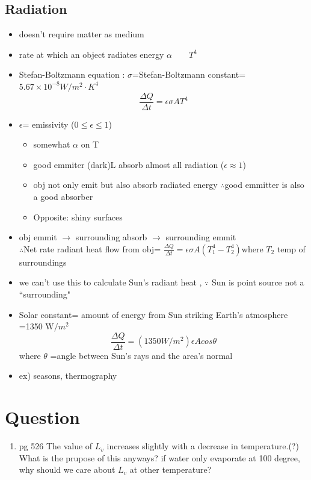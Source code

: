 \documentclass[12 pt , twoside, letterpaper] {article}
\begin{document}
		\subsection{Radiation}
			\begin{itemize}
				\item doesn't require matter as medium
				\item rate at which an object radiates energy $\alpha \quad \quad T^4$
				\item Stefan-Boltzmann equation :  $\sigma$=Stefan-Boltzmann constant=$5.67 \times 10^{-8} W/m^2 \cdot K^4$
					\begin{equation}
						\frac{\Delta Q}{\Delta t}=\epsilon\sigma A T^4					
					\end{equation}
				\item $\epsilon$= emissivity (0$\leq  \epsilon \leq1$)
						\begin{itemize}
							\item somewhat $\alpha$ on T
							\item good emmiter (dark)L absorb almost all radiation ($\epsilon\approx1$)
							\item obj not only emit but also absorb radiated energy $\therefore$good emmitter is also a good absorber
							\item Opposite: shiny surfaces
						\end{itemize}
						\item obj emmit $\rightarrow$ surrounding absorb $\rightarrow$ surrounding emmit\\
							$\therefore $Net rate radiant heat flow from obj= $\frac{\Delta Q}{ \Delta t}=\epsilon\sigma A (T_1^4- T_2^4) $where $T_2$ temp of surroundings
							\item we can't use this to calculate Sun's radiant heat , $\because$ Sun is point source not a ``surrounding"
							\item Solar constant= amount of energy from Sun striking Earth's atmosphere =1350 W$/ m^2$
							\begin{equation}
							\frac{\Delta Q}{\Delta t}=(1350 W/ m^2) \epsilon A cos\theta
							\end{equation}
							where $\theta$ =angle between Sun's rays and the area's normal
							\item ex) seasons, thermography
			\end{itemize}
	\section{Question}
		\begin{enumerate}
			\item  pg 526 	The value of $L_v$ increases slightly with a decrease in temperature.(?) What is the prupose of this anyways? if water only evaporate at 100 degree, why should we care about $L_v$ at other temperature?
		\end{enumerate}
\end{document}
